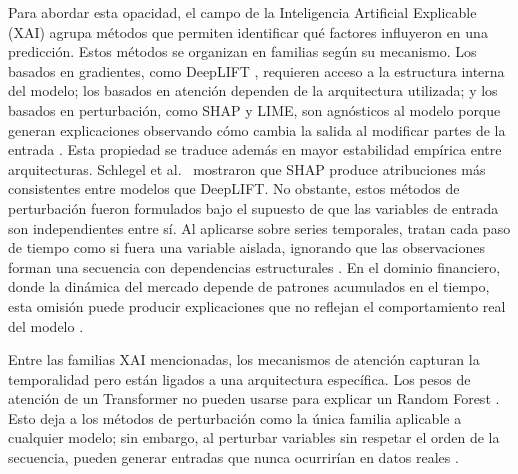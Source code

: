 \documentclass[conference, letterpaper]{IEEEtran}
\begin{document}
Para abordar esta opacidad, el campo de la Inteligencia Artificial Explicable (XAI) agrupa métodos que permiten identificar qué factores influyeron en una predicción. Estos métodos se organizan en familias según su mecanismo. Los basados en gradientes, como DeepLIFT \cite{shrikumar2017}, requieren acceso a la estructura interna del modelo; los basados en atención dependen de la arquitectura utilizada; y los basados en perturbación, como SHAP y LIME, son agnósticos al modelo porque generan explicaciones observando cómo cambia la salida al modificar partes de la entrada \cite{arsenault2025}. Esta propiedad se traduce además en mayor estabilidad empírica entre arquitecturas. Schlegel et al.~\cite{schlegel2019} mostraron que SHAP produce atribuciones más consistentes entre modelos que DeepLIFT. No obstante, estos métodos de perturbación fueron formulados bajo el supuesto de que las variables de entrada son independientes entre sí. Al aplicarse sobre series temporales, tratan cada paso de tiempo como si fuera una variable aislada, ignorando que las observaciones forman una secuencia con dependencias estructurales \cite{tonekaboni2020, huang2025}. En el dominio financiero, donde la dinámica del mercado depende de patrones acumulados en el tiempo, esta omisión puede producir explicaciones que no reflejan el comportamiento real del modelo \cite{yadav2025, crabbe2021}.


Entre las familias XAI mencionadas, los mecanismos de atención capturan la temporalidad pero están ligados a una arquitectura específica. Los pesos de atención de un Transformer no pueden usarse para explicar un Random Forest \cite{arsenault2025}. Esto deja a los métodos de perturbación como la única familia aplicable a cualquier modelo; sin embargo, al perturbar variables sin respetar el orden de la secuencia, pueden generar entradas que nunca ocurrirían en datos reales \cite{tonekaboni2020, huang2025}.
\end{document}
